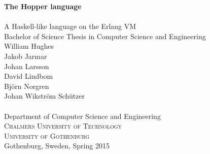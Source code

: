
\begin{titlepage}
			
\addtolength{\voffset}{2cm}


\mbox{}
\vfill
\renewcommand{\familydefault}{\sfdefault} \normalfont %
\textbf{{\Huge	The Hopper language 	\\[0.2cm] 
				}} 	\\[0.5cm]
{\Large A Haskell-like language on the Erlang VM}\\[0.5cm]
Bachelor of Science Thesis in Computer Science and Engineering \\[0.5cm]

{\Large
  William Hughes \\
  Jakob Jarmar   \\
  Johan Larsson \\
  David Lindbom \\
  Björn Norgren \\
  Johan Wikström Schützer \\
  }\\[2.0cm]


Department of Computer Science and Engineering \\
\textsc{Chalmers University of Technology} \\
\textsc{University of Gothenburg} \\
Gothenburg, Sweden, Spring 2015

\renewcommand{\familydefault}{\rmdefault} \normalfont %
\end{titlepage}


\newpage
\restoregeometry
\thispagestyle{empty}
\mbox{}


